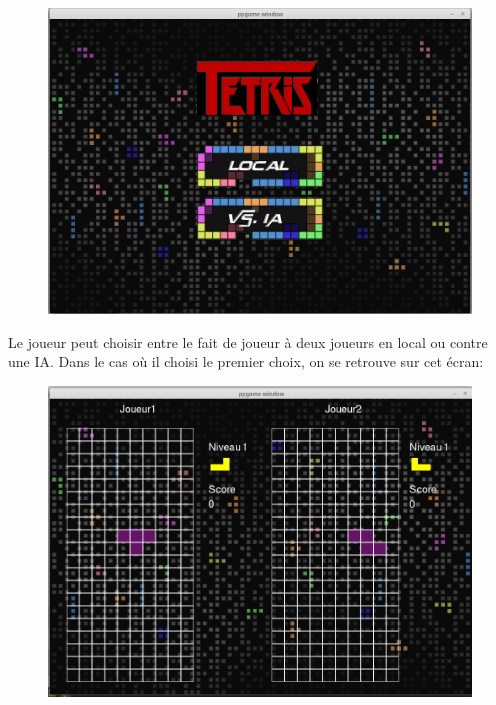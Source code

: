 \documentclass[a4paper, 11pt]{article}
\begin{document}
            \begin{figure}[ht]
                \centering
                \includegraphics[scale=0.25]{images/ecranMulti.png}
            \end{figure}
            
            Le joueur peut choisir entre le fait de joueur à deux joueurs en local ou contre une IA. Dans le cas où il choisi le premier choix, on se retrouve sur cet écran:
            
           
            \begin{figure}[ht]
                \centering
                 \includegraphics[scale=0.25]{images/jeu2J.png}
            \end{figure}
            
\end{document}
